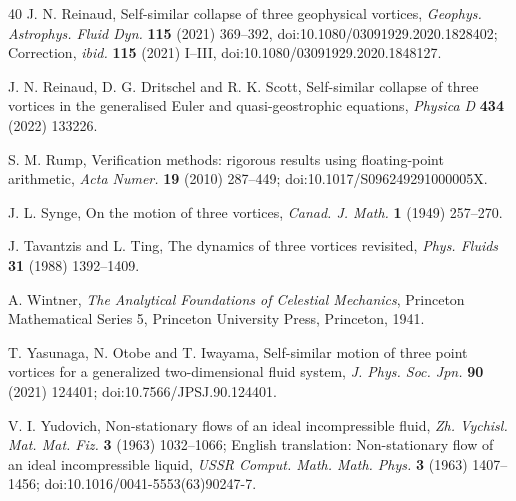 \documentclass[11pt]{article}
\theoremstyle{definition}
\begin{document}
\begin{thebibliography}{40}
 J. N. Reinaud, Self-similar collapse of three geophysical vortices, \emph{Geophys. Astrophys. Fluid Dyn.} \textbf{115} (2021) 369--392, doi:10.1080/03091929.2020.1828402; Correction, \emph{ibid.} \textbf{115} (2021) I--III, doi:10.1080/03091929.2020.1848127.

 J. N. Reinaud, D. G. Dritschel and R. K. Scott, Self-similar collapse of three vortices in the generalised Euler and quasi-geostrophic equations, \emph{Physica D} \textbf{434} (2022) 133226.

 S. M. Rump, Verification methods: rigorous results using floating-point arithmetic, \emph{Acta Numer.} \textbf{19} (2010) 287--449; doi:10.1017/S096249291000005X.

 J. L. Synge, On the motion of three vortices, \emph{Canad. J. Math.} \textbf{1} (1949) 257--270.

 J. Tavantzis and L. Ting, The dynamics of three vortices revisited, \emph{Phys. Fluids} \textbf{31} (1988) 1392--1409.

 A. Wintner, \emph{The Analytical Foundations of Celestial Mechanics}, Princeton Mathematical Series 5, Princeton University Press, Princeton, 1941.

 T. Yasunaga, N. Otobe and T. Iwayama, Self-similar motion of three point vortices for a generalized two-dimensional fluid system, \emph{J. Phys. Soc. Jpn.} \textbf{90} (2021) 124401; doi:10.7566/JPSJ.90.124401.

 V. I. Yudovich, Non-stationary flows of an ideal incompressible fluid, \emph{Zh. Vychisl. Mat. Mat. Fiz.} \textbf{3} (1963) 1032--1066; English translation: Non-stationary flow of an ideal incompressible liquid, \emph{USSR Comput. Math. Math. Phys.} \textbf{3} (1963) 1407--1456; doi:10.1016/0041-5553(63)90247-7.

\end{thebibliography}
\end{document}
